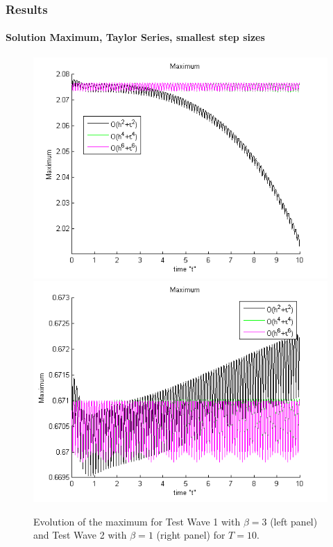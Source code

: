 \documentclass{beamer}
\begin{document}
\begin{frame}
\frametitle{Results}
\framesubtitle{Solution Maximum, Taylor Series, smallest step sizes}

\begin{figure}[ht]
	\centering
	\begin{minipage}[b]{0.4\linewidth}
		\includegraphics[width=\linewidth]{../amitans/figures/maximum_30_bt3_c045_h005.png}
	\end{minipage}	
	\begin{minipage}[b]{0.4\linewidth}
		 \includegraphics[width=\linewidth]{../amitans/figures/maximum_128_bt1_c090_h010.png}
	\end{minipage}

Evolution of the maximum for Test Wave 1 with $\beta =3$ (left panel) and Test Wave 2 with $\beta=1$ (right panel) for $T=10$.
\end{figure}

\end{frame}
\end{document}
